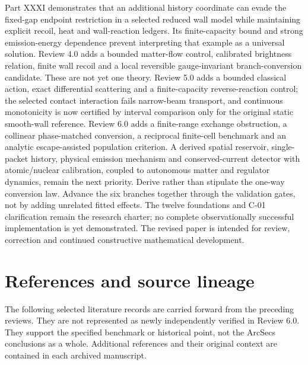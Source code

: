 \documentclass[
  11pt,
  twoside]{article}
\begin{document}
Part XXXI demonstrates that an additional history coordinate can evade
the fixed-gap endpoint restriction in a selected reduced wall model
while maintaining explicit recoil, heat and wall-reaction ledgers. Its
finite-capacity bound and strong emission-energy dependence prevent
interpreting that example as a universal solution. Review 4.0 adds a
bounded matter-flow control, calibrated brightness relation, finite wall
recoil and a local reversible gauge-invariant branch-conversion
candidate. These are not yet one theory. Review 5.0 adds a bounded
classical action, exact differential scattering and a finite-capacity
reverse-reaction control; the selected contact interaction fails
narrow-beam transport, and continuous monotonicity is now certified by
interval comparison only for the original static smooth-wall reference.
Review 6.0 adds a finite-range exchange obstruction, a collinear
phase-matched conversion, a reciprocal finite-cell benchmark and an
analytic escape-assisted population criterion. A derived spatial
reservoir, single-packet history, physical emission mechanism and
conserved-current detector with atomic/nuclear calibration, coupled to
autonomous matter and regulator dynamics, remain the next priority.
Derive rather than stipulate the one-way conversion law. Advance the six
branches together through the validation gates, not by adding unrelated
fitted effects. The twelve foundations and C-01 clarification remain the
research charter; no complete observationally successful implementation
is yet demonstrated. The revised paper is intended for review,
correction and continued constructive mathematical development.

\section{References and source
lineage}\label{references-and-source-lineage}

The following selected literature records are carried forward from the
preceding reviews. They are not represented as newly independently
verified in Review 6.0. They support the specified benchmark or
historical point, not the ArcSecs conclusions as a whole. Additional
references and their original context are contained in each archived
manuscript.
\end{document}
